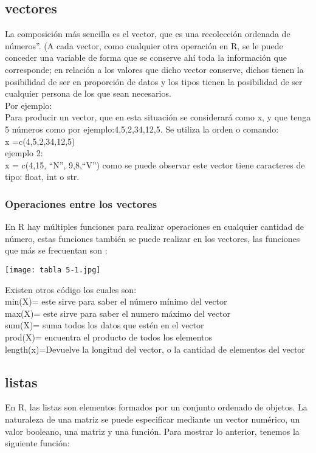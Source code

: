 \documentclass{article}
\begin{document}
\subsection{vectores}
La composición más sencilla es el vector, que es una recolección ordenada de números”.  (A cada vector, como cualquier otra operación en R, se le puede conceder una variable de forma que se conserve ahí toda la información que corresponde; en relación a los valores que dicho vector conserve, dichos tienen la posibilidad de ser en proporción de datos y los tipos tienen la posibilidad de ser cualquier persona de los que sean necesarios.\\

 Por ejemplo:\\

 Para producir un vector, que en esta situación se considerará como x, y que tenga 5 números como por ejemplo:4,5,2,34,12,5. Se utiliza la orden o comando:\\

 x =c(4,5,2,34,12,5)\\
ejemplo 2:\\

 x = c(4,15, “N”, 9,8,“V”)
como se puede observar este vector tiene caracteres de tipo: float, int o str.\\
\subsubsection{ Operaciones entre los vectores}

En R hay múltiples funciones para realizar operaciones en cualquier cantidad de número, estas funciones también se puede realizar en los vectores, las funciones que más se frecuentan son :
\begin{center}
\texttt{[image: tabla 5-1.jpg]}   
\end{center}
Existen otros código los cuales son:\\
min(X)= este sirve para saber el número mínimo del vector \\
max(X)= este sirve para saber el numero máximo del vector\\
sum(X)= suma todos los datos que estén en el vector\\ 
prod(X)= encuentra el producto de todos los elementos\\ 
length(x)=Devuelve la longitud del vector, o la cantidad de elementos del vector\\
\subsection{listas}
En R, las listas son elementos formados por un conjunto ordenado de objetos. La naturaleza de una matriz se puede especificar mediante un vector numérico, un valor booleano, una matriz y una función. Para mostrar lo anterior, tenemos la siguiente función:\\
\end{document}
